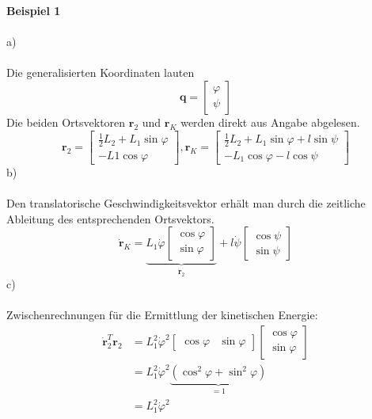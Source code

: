 \textbf{Beispiel 1} \\ \\
a)\\ \\
Die generalisierten Koordinaten lauten
\[
	\textbf{q} = \left[ \begin{matrix}
		\varphi \\
		\psi
	\end{matrix}\right]
\]
Die beiden Ortsvektoren $\textbf{r}_2$ und $\textbf{r}_K$ werden direkt aus Angabe abgelesen.
\[
	\textbf{r}_2 = \left[\begin{matrix}
		\frac{1}{2} L_2 + L_1 \sin\varphi \\
		-L1\cos\varphi
	\end{matrix}\right] , 
	\textbf{r}_K = \left[\begin{matrix}
		\frac{1}{2} L_2 + L_1\sin\varphi + l\sin\psi \\
		-L_1\cos\varphi - l\cos\psi
	\end{matrix}\right]
\]
b) \\ \\
Den translatorische Geschwindigkeitsvektor erhält man durch die zeitliche Ableitung des entsprechenden Ortsvektors.
\[
	\dot{\textbf{r}}_K = \underbrace{L_1\dot{\varphi}\left[\begin{matrix}
		\cos\varphi \\
		\sin\varphi
	\end{matrix}\right]}_{\dot{\textbf{r}}_2}
	+
	l\dot{\psi}\left[\begin{matrix}
		\cos\psi\\
		\sin\psi
	\end{matrix}\right]
\]
c) \\ \\
Zwischenrechnungen für die Ermittlung der kinetischen Energie:
\begin{align*}
	\dot{\textbf{r}}_2^T\textbf{r}_2 &= L_1^2 \dot{\varphi}^2 \left[\begin{matrix}
	 \cos\varphi & \sin\varphi
	\end{matrix}\right]
	\left[\begin{matrix}
		\cos\varphi \\
		\sin\varphi
	\end{matrix}\right] \\
	&= L_1^2\dot{\varphi}^2\underbrace{\left(\cos^2\varphi + \sin^2\varphi\right)}_{=1} \\
	&= L_1^2\dot{\varphi}^2
\end{align*}
